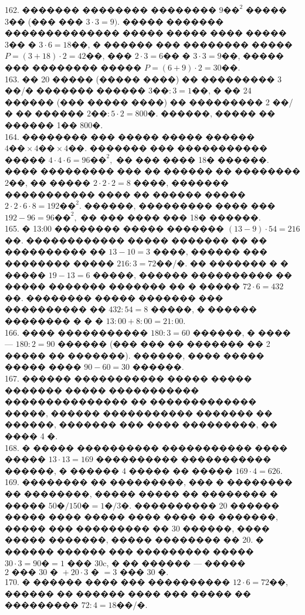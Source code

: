 \documentclass[12pt]{article}
\begin{document}
162. ������� �������� �������� $9\text{��}^2$ ����� 3�� (��� ��� $3\cdot3=9).$ ����� ������� �������������� ����� ����� ���� ����� 3�� � $3\cdot6=18$��, � ������ ��� �������� ����� $P=(3+18)\cdot2=42$��, ��� $2\cdot3=6$�� � $3\cdot3=9$��, ����� ��� �������� ����� $P=(6+9)\cdot2=30$��.\\
163. �� 20 ����� (����� ����) �� ��������� 3 ��/� ������� ������ $3\text{��}:3=1\text{��}$, � �� 24 ������ (��� ����� ����) �� ��������� 2 ��/� �� ������ $2\text{��}:5\cdot2=800$�. ������, ����� �� ������ 1�� 800�.\\
164. �������� ��� ����� ����� ������ $4\text{��}\times4\text{��}\times4\text{��}.$ ������� ��� ����������� ����� $4\cdot4\cdot6=96\text{��}^2,$ �� ��� ���� 18� ������. ���� ��������� ��� �� ������ �� �������� 2��, �� ����� $2\cdot2\cdot2=8$ ����, ������� ����������� ���� �� ������ ����� $2\cdot2\cdot6\cdot8=192\text{��}^2.$ ������, ��������� ���� ��� $192-96=96\text{��}^2,$ �� ��� ���� ��� 18� ������.\\
165. � 13:00 �������� ����� ������� $(13-9)\cdot54=216$��. ������������ ����� ������� �� �� ���������� �� $13-10=3$ ����, ������ ��� �������� ����� $216:3=72$��/�. �� ������� � � ����� $19-13=6$ �����, ������ ���������� �� ����� ������� ������� �� � ����� $72\cdot6=432$��. �������� ����� ������� ��� ���������� �� $432:54=8$ �����, � ������ �������� � � � $13:00+8:00=21:00.$\\
166. ���� ����������� $180:3=60$ ������, � ���� --- $180:2=90$ ������ (��� ��� �� ������� �� 2 ����� �� �������). ������, ���� ����� ����� ���� $90-60=30$ ������.\\
167. ������ ����������� ����� ����� ������� ����� ����������� ��������������� �� ������������� �����, ������ ����������� ������� �� ������, ������� ��� ���� ���������, �� ���� 4 �.\\
168. � ����� ���������� ����������� ���� ����� $13\cdot13=169$ ���������� ����������� ������, � ������ 4 ����� �� ����� $169\cdot4=626.$\\
169. �������� �� ���������, ��� � �������� �� ��������, ����� ����� �� �������� � ����� $50\text{�}/150\text{�}=1\text{�}/3\text{�}.$ ���������� 20 ������ ����� ���� ����� ���� ���� �� �������, ����� ��� ��������� �� 30 ������, ���� ����� �������, ����� �������� �� 20. � ������ ������ ��� ��������� ����� $30\cdot3=90\text{�}=1\text{ ��� }30$c, � �� ������ --- ����� $2\text{ ��� }30\text{ � }+20\cdot3\text{ � }=3\text{ ��� }30\text{ �.}$\\
170. � ������ ���� ��� ���������� $12\cdot6=72$��, ������ �� ������ ���� ��� ����� �� ��������� $72:4=18$��/�.\\
\end{document}
